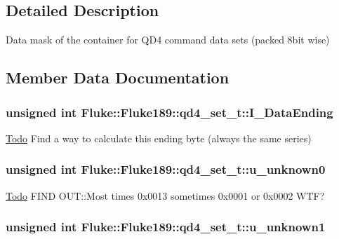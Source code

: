 \subsection{Detailed Description}
Data mask of the container for QD4 command data sets (packed 8bit wise) 

\subsection{Member Data Documentation}
\hypertarget{structFluke_1_1Fluke189_1_1qd4__set__t_a08bcc1ec254053f32250beb7ae3e7219}{
\subsubsection[{I\_\-DataEnding}]{\setlength{\rightskip}{0pt plus 5cm}unsigned int {\bf Fluke::Fluke189::qd4\_\-set\_\-t::I\_\-DataEnding}}}
\label{structFluke_1_1Fluke189_1_1qd4__set__t_a08bcc1ec254053f32250beb7ae3e7219}
\begin{Desc}
\item[\hyperlink{todo__todo000021}{Todo}]Find a way to calculate this ending byte (always the same series) \end{Desc}
\hypertarget{structFluke_1_1Fluke189_1_1qd4__set__t_a35c68a594812dba53791a2e32dbfacb6}{
\subsubsection[{u\_\-unknown0}]{\setlength{\rightskip}{0pt plus 5cm}unsigned int {\bf Fluke::Fluke189::qd4\_\-set\_\-t::u\_\-unknown0}}}
\label{structFluke_1_1Fluke189_1_1qd4__set__t_a35c68a594812dba53791a2e32dbfacb6}
\begin{Desc}
\item[\hyperlink{todo__todo000018}{Todo}]FIND OUT::Most times 0x0013 sometimes 0x0001 or 0x0002 WTF? \end{Desc}
\hypertarget{structFluke_1_1Fluke189_1_1qd4__set__t_aa49bec7dfd9d22c392297cdff277afd9}{
\subsubsection[{u\_\-unknown1}]{\setlength{\rightskip}{0pt plus 5cm}unsigned int {\bf Fluke::Fluke189::qd4\_\-set\_\-t::u\_\-unknown1}}}
